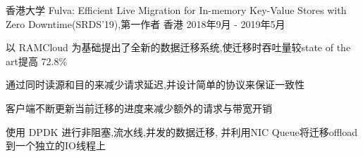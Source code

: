 \cventry
{香港大学} %
{Fulva: Efficient Live Migration for In-memory Key-Value Stores with Zero Downtime(SRDS'19),第一作者} %
{香港} %
{2018年9月 - 2019年5月} %
{ %
    \begin{cvitems}
        \item {以 RAMCloud 为基础提出了全新的数据迁移系统,使迁移时吞吐量较state of the art提高 72.8\%}
        \item {通过同时读源和目的来减少请求延迟,并设计简单的协议来保证一致性}
        \item {客户端不断更新当前迁移的进度来减少额外的请求与带宽开销}
        \item {使用 DPDK 进行非阻塞,流水线,并发的数据迁移, 并利用NIC Queue将迁移offload到一个独立的IO线程上}
    \end{cvitems}
}